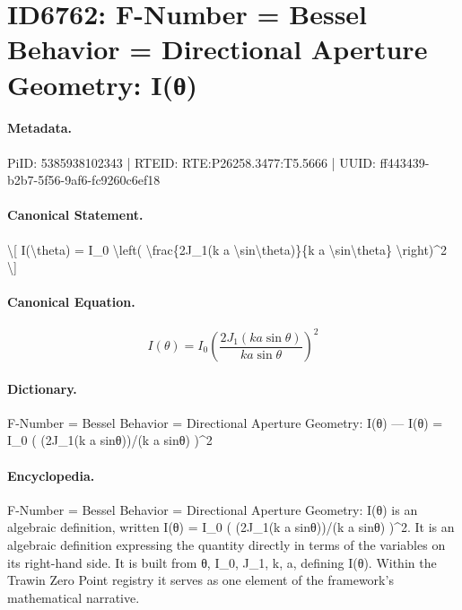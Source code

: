 \section*{ID6762: F-Number = Bessel Behavior = Directional Aperture Geometry: I(θ)}
\paragraph{Metadata.}
PiID: 5385938102343 | RTEID: RTE:P26258.3477:T5.5666 | UUID: ff443439-b2b7-5f56-9af6-fc9260c6ef18

\paragraph{Canonical Statement.}
\textbackslash{}[ I(\textbackslash{}theta) = I\_0 \textbackslash{}left( \textbackslash{}frac\{2J\_1(k a \textbackslash{}sin\textbackslash{}theta)\}\{k a \textbackslash{}sin\textbackslash{}theta\} \textbackslash{}right)\textasciicircum{}2 \textbackslash{}]

\paragraph{Canonical Equation.}
\[
I(\theta) = I_0 \left( \frac{2J_1(k a \sin\theta)}{k a \sin\theta} \right)^2
\]

\paragraph{Dictionary.}
F-Number = Bessel Behavior = Directional Aperture Geometry: I(θ) — I(θ) = I\_0 ( (2J\_1(k a sinθ))/(k a sinθ) )\textasciicircum{}2

\paragraph{Encyclopedia.}
F-Number = Bessel Behavior = Directional Aperture Geometry: I(θ) is an algebraic definition, written I(θ) = I\_0 ( (2J\_1(k a sinθ))/(k a sinθ) )\textasciicircum{}2. It is an algebraic definition expressing the quantity directly in terms of the variables on its right-hand side. It is built from θ, I\_0, J\_1, k, a, defining I(θ). Within the Trawin Zero Point registry it serves as one element of the framework's mathematical narrative.
